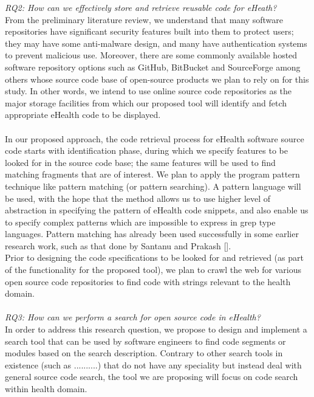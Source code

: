 \documentclass[a4paper]{article}
\begin{document}
\textit{RQ2: How can we effectively store and retrieve reusable code for eHeath?} \\
From the preliminary literature review, we understand that many software repositories have significant security features built into them to protect users; they may have some anti-malware design, and many have authentication systems to prevent malicious use. Moreover, there are some commonly available hosted software repository options such as GitHub, BitBucket and SourceForge among others whose source code base of open-source products we plan to rely on for this study. In other words, we intend to use online source code repositories as the major storage facilities from which our proposed tool will identify and fetch appropriate eHealth code to be displayed. \\ \\
In our proposed approach, the code retrieval process for eHealth software source code starts with identification phase, during which we specify features to be looked for in the source code base; the same features will be used to find matching fragments that are of interest. We plan to apply the program pattern technique like pattern matching (or pattern searching). A pattern language will be used, with the hope that the method allows us to use higher level of abstraction in specifying the pattern of eHealth code snippets, and also enable us to specify complex patterns which are impossible to express in grep type languages. Pattern matching has already been used successfully in some earlier research work, such as that done by Santanu and Prakash []. \\
Prior to designing the code specifications to be looked for and retrieved (as part of the functionality for the proposed tool), we plan to crawl the web for various open source code repositories to find code with strings relevant to the health domain.\\ \\
\textit{RQ3: How can we perform a search for open source code in eHealth?} \\
In order to address this research question, we propose to design and implement a search tool that can be used by software engineers to find code segments or modules based on the search description. Contrary to other  search tools in existence (such as ..........) that do not have any speciality but instead deal with general source code search, the tool we are proposing will focus on code search within health domain. \\
\end{document}
